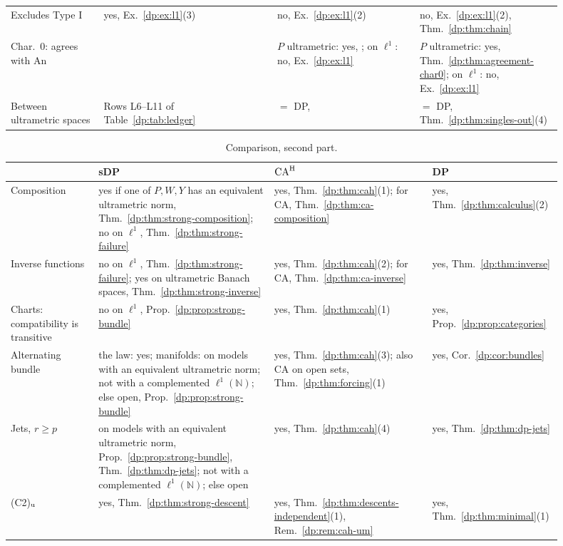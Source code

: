 \documentclass[11pt]{amsart}
\theoremstyle{definition}
\theoremstyle{remark}
\numberwithin{equation}{section}
\newcommand{\N}{\mathbb N}
\theoremstyle{plain}
\theoremstyle{definition}
\theoremstyle{plain}
\begin{document}
\begin{table}[htbp]
\begin{tabular}{@{}p{0.15\linewidth}p{0.29\linewidth}p{0.23\linewidth}p{0.23\linewidth}@{}}
Excludes Type I & yes, Ex.~\ref{dp:ex:l1}(3) & no, Ex.~\ref{dp:ex:l1}(2) & no, Ex.~\ref{dp:ex:l1}(2), Thm.~\ref{dp:thm:chain}\\
Char.\ $0$: agrees with An & & $P$ ultrametric: yes, \cite[Proposition~14.40(2)]{I}; on $\ell^1$: no, Ex.~\ref{dp:ex:l1} & $P$ ultrametric: yes, Thm.~\ref{dp:thm:agreement-char0}; on $\ell^1$: no, Ex.~\ref{dp:ex:l1}\\
Between ultrametric spaces & Rows L6--L11 of Table~\ref{dp:tab:ledger} & $=$ DP, \cite[Theorem~14.39(1)]{I} & $=$ DP, Thm.~\ref{dp:thm:singles-out}(4)\\
\end{tabular}
\end{table}

\begin{table}[htbp]
\small
\caption{Comparison, second part.}\label{dp:tab:compare-b}
\begin{tabular}{@{}p{0.15\linewidth}p{0.3\linewidth}p{0.27\linewidth}p{0.18\linewidth}@{}}
 & sDP & $\mathrm{CA}^{\rm H}$ & DP\\
\hline
Composition & yes if one of $P,W,Y$ has an equivalent ultrametric norm, Thm.~\ref{dp:thm:strong-composition}; no on $\ell^1$, Thm.~\ref{dp:thm:strong-failure} & yes, Thm.~\ref{dp:thm:cah}(1); for CA, Thm.~\ref{dp:thm:ca-composition} & yes, Thm.~\ref{dp:thm:calculus}(2)\\
Inverse functions & no on $\ell^1$, Thm.~\ref{dp:thm:strong-failure}; yes on ultrametric Banach spaces, Thm.~\ref{dp:thm:strong-inverse} & yes, Thm.~\ref{dp:thm:cah}(2); for CA, Thm.~\ref{dp:thm:ca-inverse} & yes, Thm.~\ref{dp:thm:inverse}\\
Charts: compatibility is transitive & no on $\ell^1$, Prop.~\ref{dp:prop:strong-bundle} & yes, Thm.~\ref{dp:thm:cah}(1) & yes, Prop.~\ref{dp:prop:categories}\\
Alternating bundle & the law: yes; manifolds: on models with an equivalent ultrametric norm; not with a complemented $\ell^1(\N)$; else open, Prop.~\ref{dp:prop:strong-bundle} & yes, Thm.~\ref{dp:thm:cah}(3); also CA on open sets, Thm.~\ref{dp:thm:forcing}(1) & yes, Cor.~\ref{dp:cor:bundles}\\
Jets, $r\ge p$ & on models with an equivalent ultrametric norm, Prop.~\ref{dp:prop:strong-bundle}, Thm.~\ref{dp:thm:dp-jets}; not with a complemented $\ell^1(\N)$; else open & yes, Thm.~\ref{dp:thm:cah}(4) & yes, Thm.~\ref{dp:thm:dp-jets}\\
(C2)$_{\rm u}$ & yes, Thm.~\ref{dp:thm:strong-descent} & yes, Thm.~\ref{dp:thm:descents-independent}(1), Rem.~\ref{dp:rem:cah-um} & yes, Thm.~\ref{dp:thm:minimal}(1)\\

\end{tabular}
\end{table}
\end{document}
